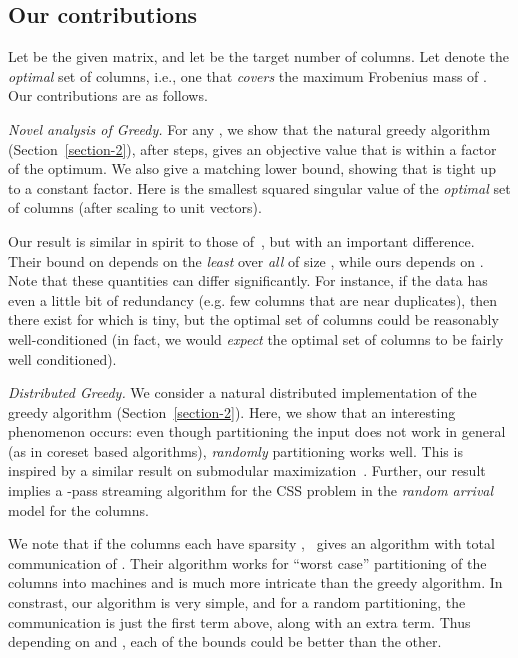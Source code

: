 \documentclass{article}
\begin{document}
\subsection{Our contributions}
Let  be the given matrix, and let  be the target number of columns. Let  denote the {\em optimal} set of columns, i.e., one that {\em covers} the maximum Frobenius mass of . Our contributions are as follows.

{\em Novel analysis of Greedy.} For any , we show that the natural greedy algorithm (Section~\ref{section-2}), after  steps, gives an objective value that is within a   factor of the optimum. We also give a matching lower bound, showing that  is tight up to a constant factor. Here  is the smallest squared singular value of the {\em optimal} set of columns (after scaling to unit vectors).

Our result is similar in spirit to those of~\cite{Civril1, Liberty}, but with an important difference. Their bound on  depends on the {\em least}  over \textit{all}  of size , while ours depends on . Note that these quantities can differ significantly. For instance, if the data has even a little bit of redundancy (e.g. few columns that are near duplicates), then there exist  for which  is tiny, but the optimal set of columns could be reasonably well-conditioned (in fact, we would {\em expect} the optimal set of columns to be fairly well conditioned).



{\em Distributed Greedy.} We consider a natural distributed implementation of the greedy algorithm (Section~\ref{section-2}). Here, we show that an interesting phenomenon occurs: even though partitioning the input does not work in general (as in coreset based algorithms), {\em randomly} partitioning works well. This is inspired by a similar result on submodular maximization~\cite{Mirrokni}. Further, our result implies a -pass streaming algorithm for the CSS problem in the {\em random arrival} model for the columns.



We note that if the columns each have sparsity ,~\cite{Boutsidis2015} gives an algorithm with total communication of . Their algorithm works for ``worst case'' partitioning of the columns into machines and is much more intricate than the greedy algorithm. In constrast, our algorithm is very simple, and for a random partitioning, the communication is just the first term above, along with an extra  term. Thus depending on  and , each of the bounds could be better than the other.
\end{document}
